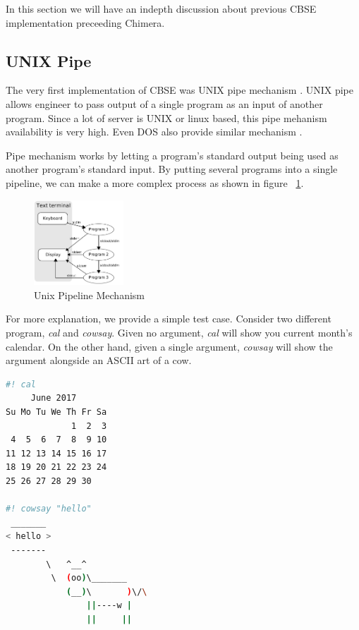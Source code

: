 \documentclass[conference]{IEEEtran}
\begin{document}
In this section we will have an indepth discussion about previous CBSE implementation 
preceeding Chimera.


\subsection{UNIX Pipe}

The very first implementation of CBSE was UNIX pipe mechanism \cite{mcilroy1968mass}. 
UNIX pipe allows engineer to pass output of a single program as an input of 
another program. Since a lot of server is UNIX or linux based, this pipe 
mehanism availability is very high. Even DOS also provide similar mechanism 
\cite{dos7command}.

Pipe mechanism works by letting a program's standard output being used as another
program's standard input. By putting several programs into a single pipeline, we can
make a more complex process as shown in figure ~\ref{fig:unixPipe}.

\begin{figure}
	\centering
	\includegraphics[width=0.3\textwidth]
		{images/Pipeline.jpg}
	\caption{Unix Pipeline Mechanism}
	\label{fig:unixPipe}
\end{figure}

For more explanation, we provide a simple test case. Consider two different program,
{\it cal} and {\it cowsay}. Given no argument, {\it cal} will show you current month's
calendar. On the other hand, given a single argument, {\it cowsay} will show the 
argument alongside an ASCII art of a cow.

\begin{lstlisting}[caption=cal and cowsay, label=calAndCowsay, language=bash, basicstyle=\small, breaklines=true]
#! cal
     June 2017        
Su Mo Tu We Th Fr Sa  
             1  2  3  
 4  5  6  7  8  9 10  
11 12 13 14 15 16 17  
18 19 20 21 22 23 24  
25 26 27 28 29 30     
                      
#! cowsay "hello"
 _______
< hello >
 -------
        \   ^__^
         \  (oo)\_______
            (__)\       )\/\
                ||----w |
                ||     ||
\end{lstlisting}
\end{document}
